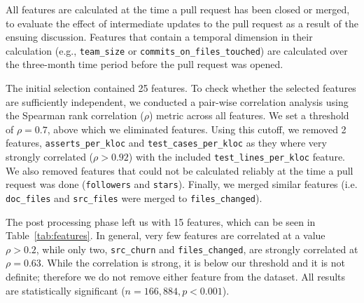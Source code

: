 \documentclass{sig-alternate}
\begin{document}
All features are calculated at the time a pull request has been closed or
merged, to evaluate the effect of intermediate updates to the pull request as a
result of the ensuing discussion. Features that contain a temporal dimension in
their calculation (e.g., \texttt{team\_size} or
\texttt{commits\_on\_files\_touched}) are calculated over the three-month time
period before the pull request was opened.

The initial selection contained 25 features. To check whe\-ther the selected
features are sufficiently independent, we
conducted a pair-wise correlation analysis using the Spearman rank correlation
($\rho$) metric across all features. We set a threshold of $\rho = 0.7$, above
which we eliminated features. Using this cutoff, we
removed 2 features, \texttt{asserts\_per\_kloc} and
\texttt{test\_cases\_per\_kloc} as they where very strongly correlated ($\rho >
0.92$) with the included \texttt{test\_lines\_per\_kloc} feature. We also
removed features that could not be calculated reliably at the time a pull
request was done (\texttt{followers} and \texttt{stars}).
Finally, we
merged similar features (i.e. \texttt{doc\_files} and \texttt{src\_files} were merged to \texttt{files\_changed}). 

The post processing phase left us with 15 features, which can be seen in
Table~\ref{tab:features}. 
In general, very few
features are correlated at a value $\rho > 0.2$, while only two,
\texttt{src\_churn} and \texttt{files\_chan\-ged}, are strongly correlated at
$\rho = 0.63$. While the correlation is strong, it is below our threshold and it
is not definite; therefore we do not remove either feature from the dataset. All
results are statistically significant ($n = 166,884, p < 0.001$).



\end{document}
